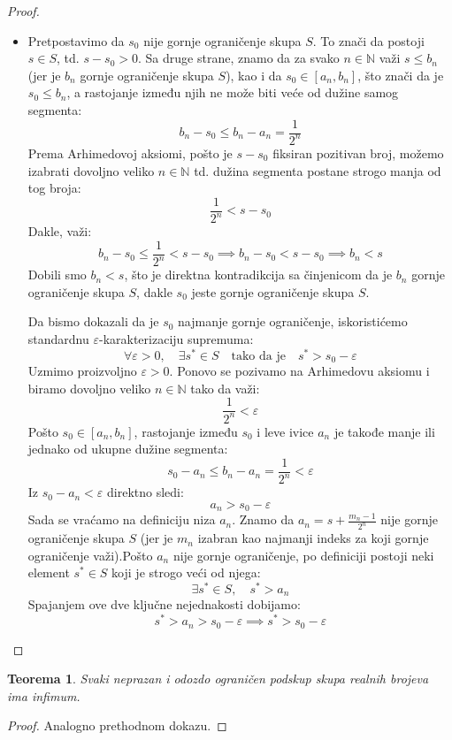 \documentclass[a4paper,12pt]{article}
\theoremstyle{plain}
\newtheorem{theorem}{Teorema}[section]
\theoremstyle{definition}
\theoremstyle{remark}
\begin{document}
\begin{proof}
\begin{itemize}
    za svako $n \in \mathbb{N}$. Međutim, na osnovu Arhimedove aksiome, postoji dovoljno veliko $n \in \mathbb{N}$ td. $\frac{1}{2^n} < y - x$. Dobijamo 
    $y - x < \frac{1}{2^n} < y - x \implies y - x < y - x$, što je kontradikcija. Dakle postoji jedinstveno $s_0 \in \bigcap_{n \in \mathbb{N}} [a_n, b_n]$.
    \item Pretpostavimo da $s_0$ nije gornje ograničenje skupa $S$. To znači da postoji $s \in S$, td. $s - s_0 > 0$. Sa druge strane, znamo da za svako $n \in \mathbb{N}$
    važi $s \leq b_n$ (jer je $b_n$ gornje ograničenje skupa $S$), kao i da $s_0 \in [a_n, b_n]$, što znači da je $s_0 \leq b_n$, a rastojanje između njih ne može biti veće od
    dužine samog segmenta: \[ b_n - s_0 \leq b_n - a_n = \frac{1}{2^n} \] Prema Arhimedovoj aksiomi, pošto je $s-s_0$ fiksiran pozitivan broj, možemo izabrati dovoljno veliko $n \in \mathbb{N}$ td.
    dužina segmenta postane strogo manja od tog broja: \[ \frac{1}{2^n} < s - s_0 \]
    Dakle, važi: \[ b_n - s_0 \leq \frac{1}{2^n} < s- s_0 \implies b_n - s_0 < s - s_0 \implies b_n < s \]
    Dobili smo $b_n < s$, što je direktna kontradikcija sa činjenicom da je $b_n$ gornje ograničenje skupa $S$, dakle $s_0$ jeste gornje ograničenje skupa $S$.

    Da bismo dokazali da je $s_0$ najmanje gornje ograničenje, iskoristićemo standardnu $\varepsilon$-karakterizaciju supremuma: $$\forall \varepsilon > 0, \quad \exists s^* \in S \quad \text{tako da je} \quad s^* > s_0 - \varepsilon$$Uzmimo proizvoljno $\varepsilon > 0$. Ponovo se pozivamo na Arhimedovu aksiomu i biramo dovoljno veliko $n \in \mathbb{N}$ tako da važi:$$\frac{1}{2^n} < \varepsilon$$Pošto $s_0 \in [a_n, b_n]$, rastojanje između $s_0$ i leve ivice $a_n$ je takođe manje ili jednako od ukupne dužine segmenta:$$s_0 - a_n \leq b_n - a_n = \frac{1}{2^n} < \varepsilon$$Iz $s_0 - a_n < \varepsilon$ direktno sledi:$$a_n > s_0 - \varepsilon$$Sada se vraćamo na definiciju niza $a_n$. Znamo da $a_n = s + \frac{m_n - 1}{2^n}$ nije gornje ograničenje skupa $S$ (jer je $m_n$ izabran kao najmanji indeks za koji gornje ograničenje važi).Pošto $a_n$ nije gornje ograničenje, po definiciji postoji neki element $s^* \in S$ koji je strogo veći od njega:$$\exists s^* \in S, \quad s^* > a_n$$Spajanjem ove dve ključne nejednakosti dobijamo:$$s^* > a_n > s_0 - \varepsilon \implies s^* > s_0 - \varepsilon$$
\end{itemize}
\end{proof}

\begin{theorem}
    Svaki neprazan i odozdo ograničen podskup skupa realnih brojeva ima infimum.
\end{theorem}
\begin{proof}
    Analogno prethodnom dokazu.
\end{proof}
\end{document}
